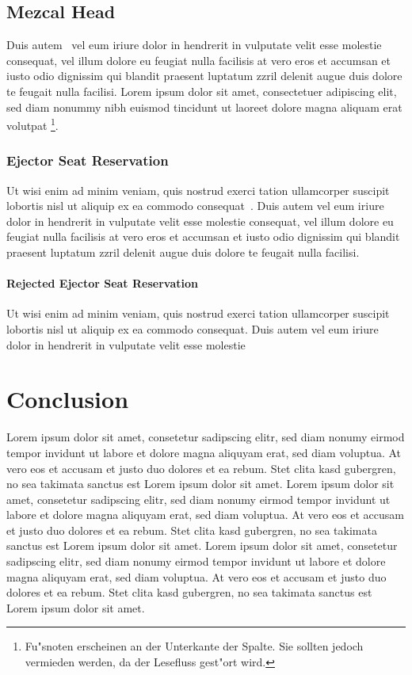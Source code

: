 \documentclass[journal]{vgtc}
\begin{document}
\subsection{Mezcal Head}

Duis autem~\cite{Lorensen:1987:MCA} vel eum iriure dolor in hendrerit
in vulputate velit esse molestie consequat, vel illum dolore eu
feugiat nulla facilisis at vero eros et accumsan et iusto odio
dignissim qui blandit praesent luptatum zzril delenit augue duis
dolore te feugait nulla facilisi. Lorem ipsum dolor sit amet,
consectetuer adipiscing elit, sed diam nonummy nibh euismod tincidunt
ut laoreet dolore magna aliquam erat volutpat%
\footnote{Fu"snoten erscheinen an der Unterkante der Spalte. Sie
  sollten jedoch vermieden werden, da der Lesefluss gest"ort wird.}.


\subsubsection{Ejector Seat Reservation}

Ut wisi enim ad minim veniam, quis nostrud exerci tation ullamcorper
suscipit lobortis nisl ut aliquip ex ea commodo
consequat~\cite{Nielson:1991:TAD}. Duis autem vel eum iriure dolor in
hendrerit in vulputate velit esse molestie consequat, vel illum dolore
eu feugiat nulla facilisis at vero eros et accumsan et iusto odio
dignissim qui blandit praesent luptatum zzril delenit augue duis
dolore te feugait nulla facilisi.

\paragraph{Rejected Ejector Seat Reservation}

Ut wisi enim ad minim veniam, quis nostrud exerci tation ullamcorper
suscipit lobortis nisl ut aliquip ex ea commodo consequat. Duis autem
vel eum iriure dolor in hendrerit in vulputate velit esse molestie

\section{Conclusion}

Lorem ipsum dolor sit amet, consetetur sadipscing elitr, sed diam
nonumy eirmod tempor invidunt ut labore et dolore magna aliquyam erat,
sed diam voluptua. At vero eos et accusam et justo duo dolores et ea
rebum. Stet clita kasd gubergren, no sea takimata sanctus est Lorem
ipsum dolor sit amet. Lorem ipsum dolor sit amet, consetetur
sadipscing elitr, sed diam nonumy eirmod tempor invidunt ut labore et
dolore magna aliquyam erat, sed diam voluptua. At vero eos et accusam
et justo duo dolores et ea rebum. Stet clita kasd gubergren, no sea
takimata sanctus est Lorem ipsum dolor sit amet. Lorem ipsum dolor sit
amet, consetetur sadipscing elitr, sed diam nonumy eirmod tempor
invidunt ut labore et dolore magna aliquyam erat, sed diam
voluptua. At vero eos et accusam et justo duo dolores et ea
rebum. Stet clita kasd gubergren, no sea takimata sanctus est Lorem
ipsum dolor sit amet.
\end{document}
